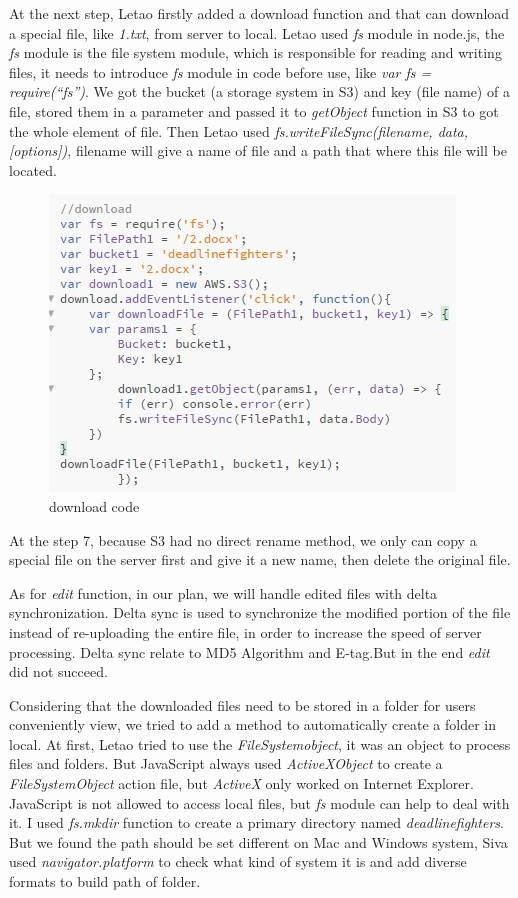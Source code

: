 \documentclass[a4paper]{article}
\begin{document}
\begin{flushleft}
At the next step, Letao firstly added a download function and that can download a special file, like \emph{1.txt}, from server to local. Letao used \emph{fs} module in node.js, the \emph{fs} module is the file system module, which is responsible for reading and writing files, it needs to introduce \emph{fs} module in code before use, like \emph{var fs = require(“fs”)}. We got the bucket (a storage system in S3) and key (file name) of a file, stored them in a parameter and passed it to \emph{getObject} function in S3 to got the whole element of file. Then Letao used \emph{fs.writeFileSync(filename, data, [options])}, filename will give a name of file and a path that where this file will be located.

\begin{figure}[h!]
\centering
\includegraphics[scale=1.3]{code1}
\caption{download code}
\label{fig:code1}
\end{figure}

At the step 7, because S3 had no direct rename method, we only can copy a special file on the server first and give it a new name, then delete the original file.\newline

As for \emph{edit} function, in our plan, we will handle edited files with delta synchronization. Delta sync is used to synchronize the modified portion of the file instead of re-uploading the entire file, in order to increase the speed of server processing. Delta sync relate to MD5 Algorithm and E-tag.But in the end \emph{edit} did not succeed.\newline

Considering that the downloaded files need to be stored in a folder for users conveniently view, we tried to add a method to automatically create a folder in local. At first, Letao tried to use the \emph{FileSystemobject}, it was an object to process files and folders. But JavaScript always used \emph{ActiveXObject} to create a \emph{FileSystemObject} action file, but \emph{ActiveX} only worked on Internet Explorer. JavaScript is not allowed to access local files, but \emph{fs} module can help to deal with it. I used \emph{fs.mkdir} function to create a primary directory named \emph{deadlinefighters}. But we found the path should be set different on Mac and Windows system, Siva used \emph{navigator.platform} to check what kind of system it is and add diverse formats to build path of folder.\newline



\end{flushleft}
\end{document}

